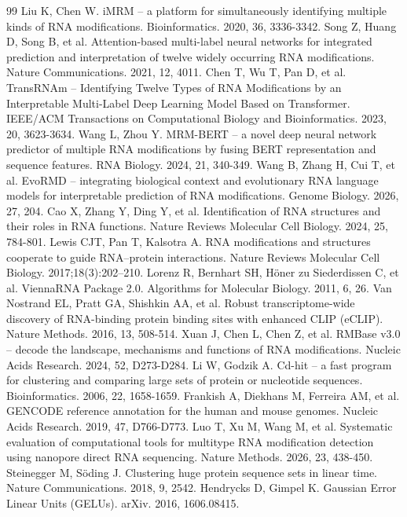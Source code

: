 \documentclass[unnumsec,webpdf,contemporary,large]{oup-authoring-template}
\begin{document}
\begin{thebibliography}{99}
Liu K, Chen W. iMRM -- a platform for simultaneously identifying multiple kinds of RNA modifications. Bioinformatics. 2020, 36, 3336-3342.
Song Z, Huang D, Song B, et al. Attention-based multi-label neural networks for integrated prediction and interpretation of twelve widely occurring RNA modifications. Nature Communications. 2021, 12, 4011.
Chen T, Wu T, Pan D, et al. TransRNAm -- Identifying Twelve Types of RNA Modifications by an Interpretable Multi-Label Deep Learning Model Based on Transformer. IEEE/ACM Transactions on Computational Biology and Bioinformatics. 2023, 20, 3623-3634.
Wang L, Zhou Y. MRM-BERT -- a novel deep neural network predictor of multiple RNA modifications by fusing BERT representation and sequence features. RNA Biology. 2024, 21, 340-349.
Wang B, Zhang H, Cui T, et al. EvoRMD -- integrating biological context and evolutionary RNA language models for interpretable prediction of RNA modifications. Genome Biology. 2026, 27, 204.
Cao X, Zhang Y, Ding Y, et al. Identification of RNA structures and their roles in RNA functions. Nature Reviews Molecular Cell Biology. 2024, 25, 784-801.
Lewis CJT, Pan T, Kalsotra A. RNA modifications and structures cooperate to guide RNA--protein interactions. Nature Reviews Molecular Cell Biology. 2017;18(3):202--210.
Lorenz R, Bernhart SH, Höner zu Siederdissen C, et al. ViennaRNA Package 2.0. Algorithms for Molecular Biology. 2011, 6, 26.
Van Nostrand EL, Pratt GA, Shishkin AA, et al. Robust transcriptome-wide discovery of RNA-binding protein binding sites with enhanced CLIP (eCLIP). Nature Methods. 2016, 13, 508-514.
Xuan J, Chen L, Chen Z, et al. RMBase v3.0 -- decode the landscape, mechanisms and functions of RNA modifications. Nucleic Acids Research. 2024, 52, D273-D284.
Li W, Godzik A. Cd-hit -- a fast program for clustering and comparing large sets of protein or nucleotide sequences. Bioinformatics. 2006, 22, 1658-1659.
Frankish A, Diekhans M, Ferreira AM, et al. GENCODE reference annotation for the human and mouse genomes. Nucleic Acids Research. 2019, 47, D766-D773.
Luo T, Xu M, Wang M, et al. Systematic evaluation of computational tools for multitype RNA modification detection using nanopore direct RNA sequencing. Nature Methods. 2026, 23, 438-450.
Steinegger M, Söding J. Clustering huge protein sequence sets in linear time. Nature Communications. 2018, 9, 2542.
Hendrycks D, Gimpel K. Gaussian Error Linear Units (GELUs). arXiv. 2016, 1606.08415.

\end{thebibliography}
\end{document}
